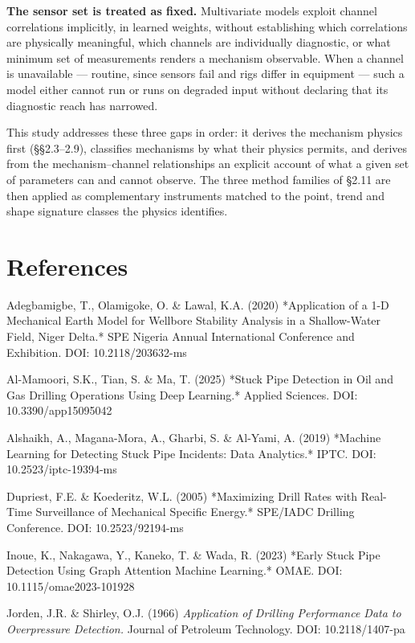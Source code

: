 \documentclass[12pt,a4paper]{report}
\begin{document}
\textbf{The sensor set is treated as fixed.} Multivariate models exploit channel correlations implicitly, in
learned weights, without establishing which correlations are physically meaningful, which channels are
individually diagnostic, or what minimum set of measurements renders a mechanism observable. When a
channel is unavailable --- routine, since sensors fail and rigs differ in equipment --- such a model either
cannot run or runs on degraded input without declaring that its diagnostic reach has narrowed.

This study addresses these three gaps in order: it derives the mechanism physics first (§§2.3--2.9),
classifies mechanisms by what their physics permits, and derives from the mechanism--channel relationships
an explicit account of what a given set of parameters can and cannot observe. The three method families of
§2.11 are then applied as complementary instruments matched to the point, trend and shape signature
classes the physics identifies.

\section*{References}

Adegbamigbe, T., Olamigoke, O. \& Lawal, K.A. (2020) *Application of a 1-D Mechanical Earth Model for
Wellbore Stability Analysis in a Shallow-Water Field, Niger Delta.* SPE Nigeria Annual International
Conference and Exhibition. DOI: 10.2118/203632-ms

Al-Mamoori, S.K., Tian, S. \& Ma, T. (2025) *Stuck Pipe Detection in Oil and Gas Drilling Operations Using
Deep Learning.* Applied Sciences. DOI: 10.3390/app15095042

Alshaikh, A., Magana-Mora, A., Gharbi, S. \& Al-Yami, A. (2019) *Machine Learning for Detecting Stuck Pipe
Incidents: Data Analytics.* IPTC. DOI: 10.2523/iptc-19394-ms

Dupriest, F.E. \& Koederitz, W.L. (2005) *Maximizing Drill Rates with Real-Time Surveillance of Mechanical
Specific Energy.* SPE/IADC Drilling Conference. DOI: 10.2523/92194-ms

Inoue, K., Nakagawa, Y., Kaneko, T. \& Wada, R. (2023) *Early Stuck Pipe Detection Using Graph Attention
Machine Learning.* OMAE. DOI: 10.1115/omae2023-101928

Jorden, J.R. \& Shirley, O.J. (1966) \emph{Application of Drilling Performance Data to Overpressure Detection.}
Journal of Petroleum Technology. DOI: 10.2118/1407-pa
\end{document}

